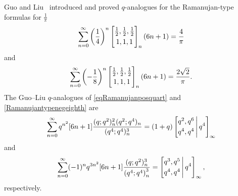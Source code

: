 \documentclass[12pt]{article}
\begin{document}
 Guo and Liu~\cite{GuoLiu2018} 
 introduced and proved $q$-analogues for the Ramanujan-type formulas for $\frac{1}{\pi}$ 
\begin{equation}\label{eqRamanujanposquart}
 \sum_{n = 0}^{\infty} \left( \frac{1}{4} \right)^{n} 
 \left[ \begin{matrix} \frac{1}{2}, \frac{1}{2}, \frac{1}{2} \vspace{1mm} \\ 
 1, 1, 1 \end{matrix} \right]_{n} (6n+1) = \frac{4}{\pi}
\end{equation}
 and 
\begin{equation}\label{Ramanujantypenegeighth}
 \sum_{n = 0}^{\infty} \left( -\frac{1}{8} \right)^{n} 
 \left[ \begin{matrix} \frac{1}{2}, \frac{1}{2}, \frac{1}{2} \vspace{1mm} \\ 
 1, 1, 1 \end{matrix} \right]_{n} (6n+1) = \frac{2\sqrt{2}}{\pi}. 
\end{equation}
 The Guo--Liu $q$-analogues of \eqref{eqRamanujanposquart} 
 and \eqref{Ramanujantypenegeighth} are 
\begin{equation}\label{firstGuoLiuq}
 \sum_{n=0}^{\infty} 
 q^{n^2} [6n+1] 
 \frac{ (q; q^2 )_{n}^{2} (q^2;q^4)_{n} }{ (q^4;q^4)_{n}^{3} } = 
 (1 + q) \left[ \begin{matrix} q^2, q^6 \vspace{1mm} \\ 
 q^4, q^4 \end{matrix} \, \Bigg| \, q^4 \right]_{\infty} 
\end{equation} 
 and 
\begin{equation}\label{GuoLiusecond}
 \sum_{n=0}^{\infty} 
 (-1)^n q^{3n^2} [6n+1] 
 \frac{ ( q; q^2 )_{n}^{3} }{ \left( q^{4}; q^{4} \right)_{n}^{3} 	 }
 = \left[ \begin{matrix} q^3, q^5 \vspace{1mm} \\ 
 q^4, q^4 \end{matrix} \, \Bigg| \, q^4 \right]_{\infty}, 
\end{equation}
 respectively. 
\end{document}
